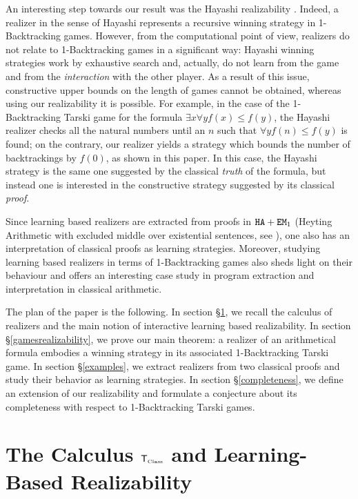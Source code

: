 \documentclass[copyright,creativecommons]{eptcs}
\newcommand{\EM}                       { {\tt EM} }
\newcommand{\HA}                       { {\tt HA} }
\newcommand{\SystemT}                  {\mathsf{T}}
\newcommand{\Class}                    {\mbox{\tiny Class}}
\newcommand{\SystemTClass}             {{\SystemT_{\Class}}}
\begin{document}
An interesting step towards our result was the Hayashi realizability \cite{Hayashi1}. Indeed, a realizer in the sense of Hayashi  represents a recursive winning strategy in 1-Backtracking games. However, from the computational point of view,  realizers do not relate to 1-Backtracking games in a significant way: Hayashi winning strategies work by exhaustive search and, actually, do not learn from the game and from the \emph{interaction} with the other player. As a result of this issue, constructive upper bounds on the length of games cannot be obtained, whereas using our realizability it is possible. For example, in the case of the 1-Backtracking Tarski game for the formula $\exists x \forall y f(x)\leq f(y)$, the Hayashi realizer checks all the natural numbers until an $n$ such that $\forall y f(n)\leq f(y)$ is found; on the contrary, our realizer yields a strategy which bounds the number of backtrackings by $f(0)$, as shown in this paper. In this case, the Hayashi strategy is the same one suggested by the classical \emph{truth} of the formula, but instead one is interested in the constructive strategy suggested by its classical \emph{proof}.

Since learning based realizers are extracted from proofs in $\HA+ \EM_1$ (Heyting Arithmetic with excluded middle over existential sentences, see \cite{Aschieri}), one also has an interpretation of classical proofs as learning strategies. Moreover, studying  learning based realizers in terms of 1-Backtracking games also sheds light on their behaviour and offers an interesting case study in program extraction and interpretation in classical arithmetic. 

The plan of the paper is the following. In section \S \ref{calculusandrealizability}, we recall the calculus of realizers and the main notion of interactive learning based realizability. In section \S \ref{gamesrealizability}, we prove our main theorem: a realizer of an arithmetical formula embodies a winning strategy in its associated 1-Backtracking Tarski game. In section \S \ref{examples}, we extract realizers from two classical proofs and study their behavior as learning strategies. In section \S \ref{completeness}, we define an extension of our realizability and formulate a conjecture about its completeness with respect to 1-Backtracking Tarski games.



\section{The Calculus $\SystemTClass$ and Learning-Based Realizability}\label{calculusandrealizability}
\end{document}
